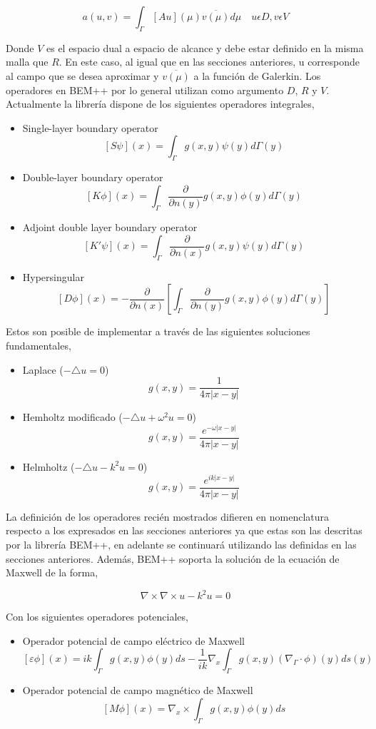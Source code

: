 \documentclass[12pt,letterpaper]{article}
\numberwithin{equation}{section}
\begin{document}
$$a(u,v)=\int_{\Gamma}\left[ Au\right](\mu) \overline{v(\mu)} d\mu \quad u\epsilon D,v\epsilon V $$

Donde $V$ es el espacio dual a espacio de alcance y debe estar definido en la misma malla que $R$. En este caso, al igual que en las secciones anteriores, u corresponde al campo que se desea aproximar y $\overline{v(\mu)}$ a la función de Galerkin. Los operadores en BEM++ por lo general utilizan como argumento $D$, $R$ y $V$. Actualmente la librería dispone de los siguientes operadores integrales,

\begin{itemize}
	\item Single-layer boundary operator 
	$$[S\psi](x)=\int_{\Gamma}g(x,y)\psi(y) d\varGamma(y)$$
	\item Double-layer boundary operator $$[K\phi](x)=\int_{\Gamma}\frac{\partial}{\partial n(y)} g(x,y)\phi(y) d\varGamma(y)$$
	\item Adjoint double layer boundary operator
	$$[K'\psi](x)=\int_{\Gamma}\frac{\partial}{\partial n(x)}g(x,y)\psi(y) d\varGamma(y)$$
	\item Hypersingular
	$$[D\phi](x)=-\frac{\partial}{\partial n(x)}\left[ \int_{\Gamma}\frac{\partial}{\partial n(y)} g(x,y)\phi(y) d\varGamma(y)\right]$$
\end{itemize}

Estos son posible de implementar a través de las siguientes soluciones fundamentales,

\begin{itemize}
	\item Laplace ($-\triangle u=0$)
	$$g(x,y)=\frac{1}{4\pi |x-y|}$$
	\item Hemholtz modificado ($-\triangle u+\omega^2u=0$)
	$$g(x,y)=\frac{e^{-\omega|x-y|}}{4\pi |x-y|}$$
	\item Helmholtz ($-\triangle u-k^2u=0$)
	$$g(x,y)=\frac{e^{ik|x-y|}}{4\pi |x-y|}$$
\end{itemize}

La definición de los operadores recién mostrados difieren en nomenclatura respecto a los expresados en las secciones anteriores ya que estas son las descritas por la librería BEM++, en adelante se continuará utilizando las definidas en las secciones anteriores. Además, BEM++ soporta la solución de la ecuación de Maxwell de la forma,

$$\nabla\times\nabla\times u-k^2u=0$$

Con los siguientes operadores potenciales,
\begin{itemize}
	\item Operador potencial de campo eléctrico de Maxwell 
	$$\left[\varepsilon\phi \right](x)=ik\int_{\Gamma}g(x,y)\phi(y)ds-\frac{1}{ik}\nabla_x\int_{\Gamma}g(x,y)(\nabla_\Gamma\cdotp\phi)(y)ds(y)$$
	\item Operador potencial de campo magnético de Maxwell
	$$\left[M\phi \right](x)=\nabla_x\times\int_{\Gamma}g(x,y)\phi(y)ds$$
\end{itemize}
\end{document}
